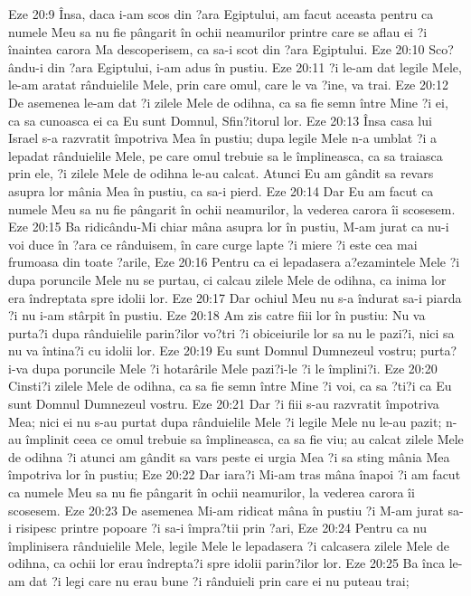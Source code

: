 Eze 20:9  Însa, daca i-am scos din ?ara Egiptului, am facut aceasta pentru ca numele Meu sa nu fie pângarit în ochii neamurilor printre care se aflau ei ?i înaintea carora Ma descoperisem, ca sa-i scot din ?ara Egiptului.
Eze 20:10  Sco?ându-i din ?ara Egiptului, i-am adus în pustiu.
Eze 20:11  ?i le-am dat legile Mele, le-am aratat rânduielile Mele, prin care omul, care le va ?ine, va trai.
Eze 20:12  De asemenea le-am dat ?i zilele Mele de odihna, ca sa fie semn între Mine ?i ei, ca sa cunoasca ei ca Eu sunt Domnul, Sfin?itorul lor.
Eze 20:13  Însa casa lui Israel s-a razvratit împotriva Mea în pustiu; dupa legile Mele n-a umblat ?i a lepadat rânduielile Mele, pe care omul trebuie sa le împlineasca, ca sa traiasca prin ele, ?i zilele Mele de odihna le-au calcat. Atunci Eu am gândit sa revars asupra lor mânia Mea în pustiu, ca sa-i pierd.
Eze 20:14  Dar Eu am facut ca numele Meu sa nu fie pângarit în ochii neamurilor, la vederea carora îi scosesem.
Eze 20:15  Ba ridicându-Mi chiar mâna asupra lor în pustiu, M-am jurat ca nu-i voi duce în ?ara ce rânduisem, în care curge lapte ?i miere ?i este cea mai frumoasa din toate ?arile,
Eze 20:16  Pentru ca ei lepadasera a?ezamintele Mele ?i dupa poruncile Mele nu se purtau, ci calcau zilele Mele de odihna, ca inima lor era îndreptata spre idolii lor.
Eze 20:17  Dar ochiul Meu nu s-a îndurat sa-i piarda ?i nu i-am stârpit în pustiu.
Eze 20:18  Am zis catre fiii lor în pustiu: Nu va purta?i dupa rânduielile parin?ilor vo?tri ?i obiceiurile lor sa nu le pazi?i, nici sa nu va întina?i cu idolii lor.
Eze 20:19  Eu sunt Domnul Dumnezeul vostru; purta?i-va dupa poruncile Mele ?i hotarârile Mele pazi?i-le ?i le împlini?i.
Eze 20:20  Cinsti?i zilele Mele de odihna, ca sa fie semn între Mine ?i voi, ca sa ?ti?i ca Eu sunt Domnul Dumnezeul vostru.
Eze 20:21  Dar ?i fiii s-au razvratit împotriva Mea; nici ei nu s-au purtat dupa rânduielile Mele ?i legile Mele nu le-au pazit; n-au împlinit ceea ce omul trebuie sa împlineasca, ca sa fie viu; au calcat zilele Mele de odihna ?i atunci am gândit sa vars peste ei urgia Mea ?i sa sting mânia Mea împotriva lor în pustiu;
Eze 20:22  Dar iara?i Mi-am tras mâna înapoi ?i am facut ca numele Meu sa nu fie pângarit în ochii neamurilor, la vederea carora îi scosesem.
Eze 20:23  De asemenea Mi-am ridicat mâna în pustiu ?i M-am jurat sa-i risipesc printre popoare ?i sa-i împra?tii prin ?ari,
Eze 20:24  Pentru ca nu împlinisera rânduielile Mele, legile Mele le lepadasera ?i calcasera zilele Mele de odihna, ca ochii lor erau îndrepta?i spre idolii parin?ilor lor.
Eze 20:25  Ba înca le-am dat ?i legi care nu erau bune ?i rânduieli prin care ei nu puteau trai;
